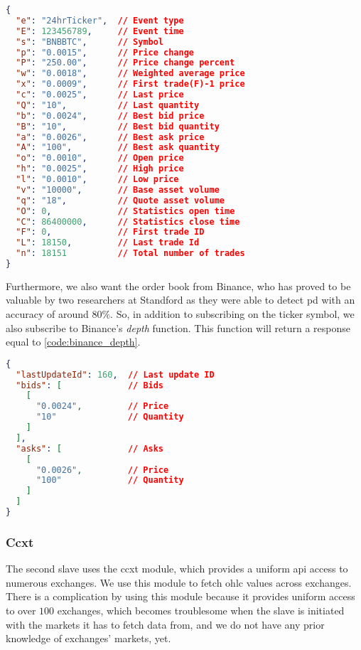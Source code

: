 \begin{lstlisting}[language=json, caption={Ticker response from Binance.}, label=code:binance_tick]
{
  "e": "24hrTicker",  // Event type
  "E": 123456789,     // Event time
  "s": "BNBBTC",      // Symbol
  "p": "0.0015",      // Price change
  "P": "250.00",      // Price change percent
  "w": "0.0018",      // Weighted average price
  "x": "0.0009",      // First trade(F)-1 price
  "c": "0.0025",      // Last price
  "Q": "10",          // Last quantity
  "b": "0.0024",      // Best bid price
  "B": "10",          // Best bid quantity
  "a": "0.0026",      // Best ask price
  "A": "100",         // Best ask quantity
  "o": "0.0010",      // Open price
  "h": "0.0025",      // High price
  "l": "0.0010",      // Low price
  "v": "10000",       // Base asset volume
  "q": "18",          // Quote asset volume
  "O": 0,             // Statistics open time
  "C": 86400000,      // Statistics close time
  "F": 0,             // First trade ID
  "L": 18150,         // Last trade Id
  "n": 18151          // Total number of trades
}
\end{lstlisting}

Furthermore, we also want the order book from Binance, who has proved to be valuable by two researchers at Standford as they were able to detect \ac{pd} with an accuracy of around $80\%$. So, in addition to subscribing on the ticker symbol, we also subscribe to Binance's \emph{depth} function. This function will return a response equal to \autoref{code:binance_depth}.

\begin{lstlisting}[language=json, caption={Depth response from Binance.}, label=code:binance_depth]
{
  "lastUpdateId": 160,  // Last update ID
  "bids": [             // Bids
    [
      "0.0024",         // Price
      "10"              // Quantity
    ]
  ],
  "asks": [             // Asks
    [
      "0.0026",         // Price
      "100"             // Quantity
    ]
  ]
}
\end{lstlisting}

\subsubsection{Ccxt}
The second slave uses the ccxt module, which provides a uniform \ac{api} access to numerous exchanges. We use this module to fetch \ac{ohlc} values across exchanges. There is a complication by using this module because it provides uniform access to over $100$ exchanges, which becomes troublesome when the slave is initiated with the markets it has to fetch data from, and we do not have any prior knowledge of exchanges' markets, yet.

